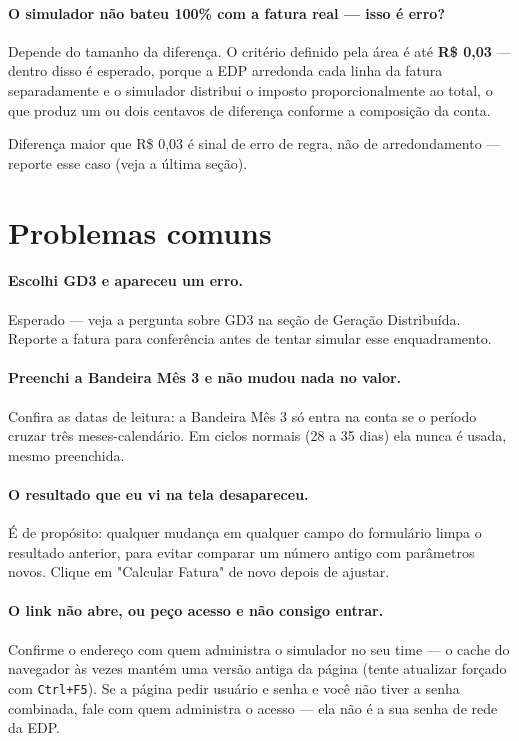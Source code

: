 \documentclass[11pt,a4paper]{article}
\newcommand{\campo}[1]{\texttt{\small #1}}
\begin{document}
\paragraph{O simulador não bateu 100\% com a fatura real --- isso é erro?}
Depende do tamanho da diferença. O critério definido pela área é até \textbf{R\$ 0,03} --- dentro disso é esperado, porque a EDP arredonda cada linha da fatura separadamente e o simulador distribui o imposto proporcionalmente ao total, o que produz um ou dois centavos de diferença conforme a composição da conta.

\begin{warnbox}
Diferença maior que R\$ 0,03 é sinal de erro de regra, não de arredondamento --- reporte esse caso (veja a última seção).
\end{warnbox}

\section{Problemas comuns}

\paragraph{Escolhi GD3 e apareceu um erro.}
Esperado --- veja a pergunta sobre GD3 na seção de Geração Distribuída. Reporte a fatura para conferência antes de tentar simular esse enquadramento.

\paragraph{Preenchi a Bandeira Mês 3 e não mudou nada no valor.}
Confira as datas de leitura: a Bandeira Mês 3 só entra na conta se o período cruzar três meses-calendário. Em ciclos normais (28 a 35 dias) ela nunca é usada, mesmo preenchida.

\paragraph{O resultado que eu vi na tela desapareceu.}
É de propósito: qualquer mudança em qualquer campo do formulário limpa o resultado anterior, para evitar comparar um número antigo com parâmetros novos. Clique em "Calcular Fatura" de novo depois de ajustar.

\paragraph{O link não abre, ou peço acesso e não consigo entrar.}
Confirme o endereço com quem administra o simulador no seu time --- o cache do navegador às vezes mantém uma versão antiga da página (tente atualizar forçado com \campo{Ctrl+F5}). Se a página pedir usuário e senha e você não tiver a senha combinada, fale com quem administra o acesso --- ela não é a sua senha de rede da EDP.
\end{document}
